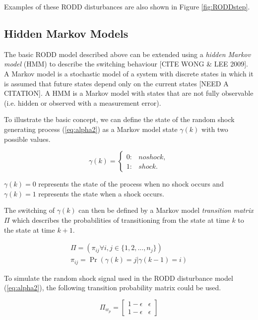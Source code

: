 Examples of these RODD disturbances are also shown in Figure \ref{fig:RODDstep}.

\subsection{Hidden Markov Models}

The basic RODD model described above can be extended using a \textit{hidden Markov model} (HMM) to describe the switching behaviour [CITE WONG \& LEE 2009]. A Markov model is a stochastic model of a system with discrete states in which it is assumed that future states depend only on the current states [NEED A CITATION]. A HMM is a Markov model with states that are not fully observable (i.e. hidden or observed with a measurement error).

To illustrate the basic concept, we can define the state of the random shock generating process (\ref{eq:alpha2}) as a Markov model state $\gamma(k)$ with two possible values.

\begin{equation} \label{eq:gamma-k}
	\gamma(k) = 
	\begin{cases*}
		0: & no shock, \\
		1: & shock.
	\end{cases*}
\end{equation}

$\gamma(k)=0$ represents the state of the process when no shock occurs and $\gamma(k)=1$ represents the state when a shock occurs.

The switching of $\gamma(k)$ can then be defined by a Markov model \textit{transition matrix} $\Pi$ which describes the probabilities of transitioning from the state at time $k$ to the state at time $k+1$.

\begin{equation} \label{eq:Pi}
	\begin{split}
	\Pi = \left(\pi_{ij} \forall i,j\in \{1,2,...,n_j\}\right) \\
	\pi_{ij}=\Pr\left(\gamma(k)=j|\gamma(k-1)=i\right)
	\end{split}
\end{equation}

To simulate the random shock signal used in the RODD disturbance model (\ref{eq:alpha2}), the following transition probability matrix could be used.

\begin{equation} \label{eq:Pi-RODD-step}
	\Pi_{w_{p}} = \begin{bmatrix}
	1-\epsilon & \epsilon \\
	1-\epsilon & \epsilon
	\end{bmatrix}
\end{equation}

